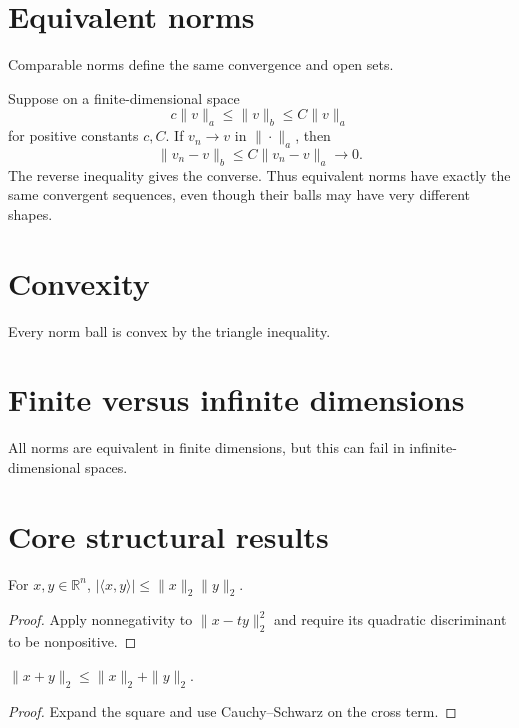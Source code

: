 \section{Equivalent norms}
Comparable norms define the same convergence and open sets.


\begin{example}\label{ex:ii02-expand-03}
Suppose on a finite-dimensional space
\[
c\|v\|_a\le\|v\|_b\le C\|v\|_a
\]
for positive constants \(c,C\). If \(v_n\to v\) in \(\|\cdot\|_a\), then
\[
\|v_n-v\|_b\le C\|v_n-v\|_a\to0.
\]
The reverse inequality gives the converse. Thus equivalent norms have exactly
the same convergent sequences, even though their balls may have very different
shapes.
\end{example}
\section{Convexity}
Every norm ball is convex by the triangle inequality.

\section{Finite versus infinite dimensions}
All norms are equivalent in finite dimensions, but this can fail in infinite-dimensional spaces.

\section{Core structural results}

\begin{theorem}\label{thm:ii02-01}
For $x,y\in\mathbb R^n$, $|\langle x,y\rangle|\le\|x\|_2\|y\|_2$.
\begin{proof}
Apply nonnegativity to $\|x-ty\|_2^2$ and require its quadratic discriminant to be nonpositive.
\end{proof}
\end{theorem}

\begin{theorem}\label{thm:ii02-02}
$\|x+y\|_2\le\|x\|_2+\|y\|_2$.
\begin{proof}
Expand the square and use Cauchy--Schwarz on the cross term.
\end{proof}
\end{theorem}

